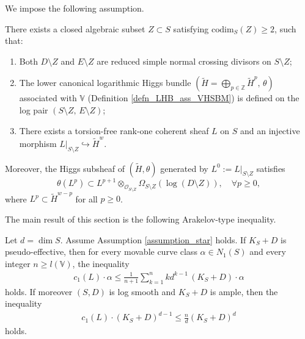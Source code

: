 \documentclass[11pt,letterpaper]{amsart}
\numberwithin{equation}{section}
\begin{document}
We impose the following assumption.
\begin{assumption}\label{assumption_star}
	There exists a closed algebraic subset $Z \subset S$ satisfying $\mathrm{codim}_S(Z) \geq 2$, such that:  
	\begin{enumerate}
		\item[(i)] Both $D \setminus Z$ and $E \setminus Z$ are reduced simple normal crossing divisors on $S \setminus Z$;  
		\item[(ii)] The lower canonical logarithmic Higgs bundle $(\widetilde{H} = \bigoplus_{p \in \mathbb{Z}} \widetilde{H}^p,\, \theta)$ associated with $\mathbb{V}$ (Definition \ref{defn_LHB_ass_VHSBM}) is defined on the log pair $(S \setminus Z,\, E \setminus Z)$;  
		\item[(iii)] There exists a torsion-free rank-one coherent sheaf $L$ on $S$ and an injective morphism $L|_{S \setminus Z} \hookrightarrow \widetilde{H}^w$.  
	\end{enumerate}  
	Moreover, the Higgs subsheaf of $(\widetilde{H}, \theta)$ generated by $L^0 := L|_{S \setminus Z}$ satisfies  
	\[
	\theta(L^p) \subset L^{p+1} \otimes_{\mathcal{O}_{S \setminus Z}} \Omega_{S \setminus Z}(\log (D \setminus Z)), \quad \forall p \geq 0,
	\]  
	where $L^p \subset \widetilde{H}^{w-p}$ for all $p \geq 0$.
\end{assumption}
The main result of this section is the following Arakelov-type inequality.
\begin{thm}\label{thm_Hodge_Arakelov}
	Let $d = \dim S$. Assume Assumption \ref{assumption_star} holds. If $K_S + D$ is pseudo-effective, then for every movable curve class $\alpha \in N_1(S)$ and every integer $n \geq l(\mathbb{V})$, the inequality  
	\begin{align}\label{align_Araineq_abs1}
		c_1(L) \cdot \alpha \leq \frac{1}{n + 1}\sum_{k=1}^{n} k d^{k-1} \, (K_S + D) \cdot \alpha
	\end{align}  
	holds.
	If moreover $(S,D)$ is log smooth and $K_S+D$ is ample, then the inequality  
	\begin{align*}
		c_1(L) \cdot(K_S+D)^{d-1} \leq \frac{n}{d}(K_S+D)^{d}
	\end{align*}  
	holds.
\end{thm}
\end{document}

